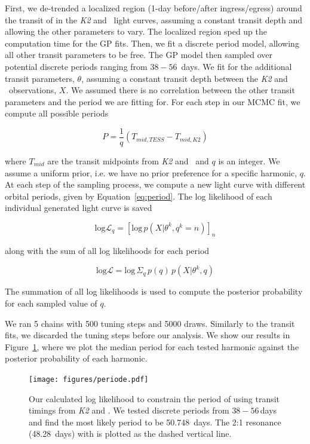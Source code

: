 \documentclass[twocolumn]{aastex631}
\begin{document}
First, we de-trended a localized region (1-day before/after ingress/egress) around the transit of \planete in the \textit{K2} and \tess\ light curves, assuming a constant transit depth and allowing the other parameters to vary. The localized region sped up the computation time for the GP fits. Then, we fit a discrete period model, allowing all other transit parameters to be free. The GP model then sampled over potential discrete periods ranging from $38 - 56$~days. We fit for the additional transit parameters, $\theta$, assuming a constant transit depth between the \textit{K2} and \tess\ observations, $X$. We assumed there is no correlation between the other transit parameters and the period we are fitting for. For each step in our MCMC fit, we compute all possible periods

\begin{equation}\label{eq:period}
    P = \frac{1}{q} \left(T_{mid,TESS} - T_{mid, K2}\right)
\end{equation}

where $T_{mid}$ are the transit midpoints from \textit{K2} and \tess\ and $q$ is an integer. We assume a uniform prior, i.e. we have no prior preference for a specific harmonic, $q$. At each step of the sampling process, we compute a new light curve with different orbital periods, given by Equation~\ref{eq:period}. The log likelihood of each individual generated light curve is saved

\begin{equation}
    \textrm{log} \mathcal{L}_q = \left[ \textrm{log}\, p \left( X | \theta^k, q^k = n \right) \right]_n
\end{equation}

along with the sum of all log likelihoods for each period 

\begin{equation}
    \textrm{log} \mathcal{L} = \textrm{log}\, \Sigma_q\, p(q)\, p(X|\theta^k, q) 
\end{equation}

The summation of all log likelihoods is used to compute the posterior probability for each sampled value of $q$. 

We ran 5 chains with 500 tuning steps and 5000 draws. Similarly to the transit fits, we discarded the tuning steps before our analysis. We show our results in Figure~\ref{fig:period_e}, where we plot the median period for each tested harmonic against the posterior probability of each harmonic.

\begin{figure}[!ht]
\begin{center}
\texttt{[image: figures/periode.pdf]}
\caption{Our calculated log likelihood to constrain the period of \planete using transit timings from \textit{K2} and \tess. We tested discrete periods from $38-56$\,days and find the most likely period to be 50.748~days. The 2:1 resonance (48.28~days) with \planetb is plotted as the dashed vertical line.} \label{fig:period_e}
\end{center}
\end{figure}
\end{document}
